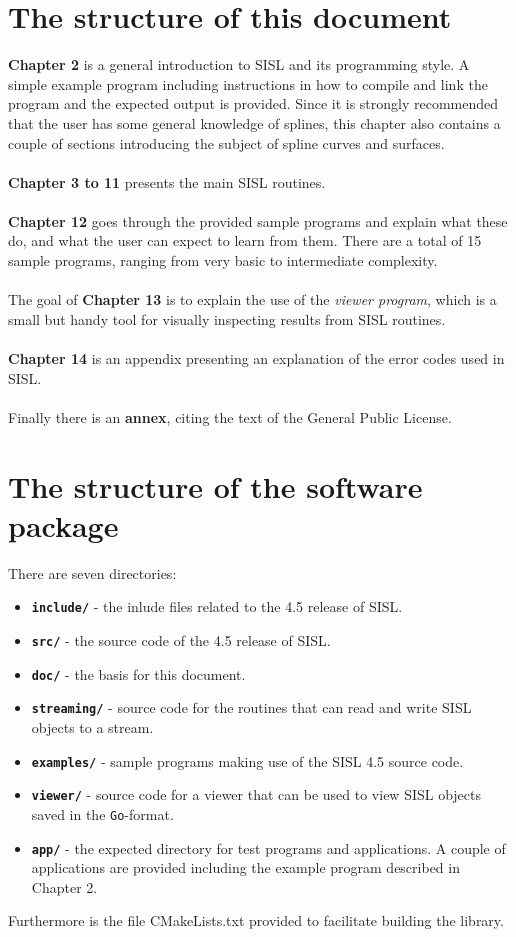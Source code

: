 \section{The structure of this document}
\textbf{Chapter 2} is a general introduction to SISL and its programming style. A simple example program
including instructions in how to compile and link the program and the expected output is provided.
Since it is strongly recommended that the user has some general knowledge of splines, this 
chapter also contains a couple of sections introducing the subject of spline curves and
surfaces. \\
\\
\textbf{Chapter 3 to 11} presents the main SISL routines.  \\
\\
\textbf{Chapter 12} goes through the provided sample programs and explain what these do,
and what the user can expect to learn from them.  There are a total of 15 sample 
programs, ranging from very basic to intermediate complexity.\\
\\
The goal of \textbf{Chapter 13} is to explain the use of the \emph{viewer program}, 
which is a small but handy tool for visually inspecting results from SISL routines.\\
\\
\textbf{Chapter 14} is an appendix presenting an explanation of the error codes used in SISL.\\
\\
Finally there is an \textbf{annex}, citing the text of the General Public License.

\section{The structure of the software package}\label{compile}
There are seven directories:
\begin{itemize}
\item \textbf{\Verb-include/-} - the inlude files related to the 4.5 release of SISL.
\item \textbf{\Verb-src/-} - the source code of the 4.5 release of SISL.
\item \textbf{\Verb-doc/-} - the basis for this document. 
\item \textbf{\Verb-streaming/-} - source code for the routines that can read and write
SISL objects to a stream.
\item \textbf{\Verb-examples/-} - sample programs making use of the SISL 4.5 source code.
\item \textbf{\Verb-viewer/-} - source code for a viewer that can be used to view SISL 
  objects saved in the \verb/Go/-format.
\item \textbf{\Verb-app/-} - the expected directory for test programs and applications. A
  couple of applications are provided including the example program described in Chapter 2.
\end{itemize}
Furthermore is the file CMakeLists.txt provided to facilitate building the library.

